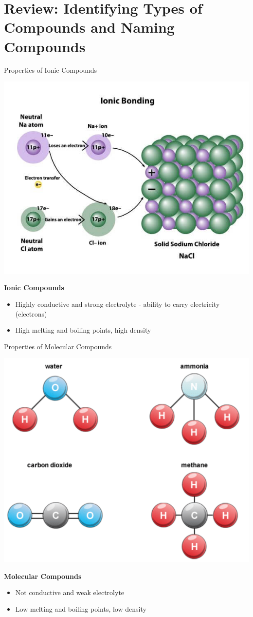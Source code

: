 \documentclass[11pt]{beamer}
\begin{document}
\section{Review: Identifying Types of Compounds and Naming Compounds}

\begin{frame}{Properties of Ionic Compounds}
  \begin{center}
    \includegraphics[width=0.6\linewidth]{Ionic-bond-example}
  \end{center}
  \vspace{-0.3in}
  \textbf{Ionic Compounds}
  \begin{itemize}
  \item Highly conductive and strong electrolyte - ability to
    carry electricity (electrons)
  \item High melting and boiling points, high density
  \end{itemize}
\end{frame}

\begin{frame}{Properties of Molecular Compounds}
  \begin{center}
    \includegraphics[width=0.6\linewidth]{molec_example}
  \end{center}
  \vspace{-0.3in}
  \textbf{Molecular Compounds}
  \begin{itemize}
  \item Not conductive and weak electrolyte
  \item Low melting and boiling points, low density
  \end{itemize}
\end{frame}
\end{document}
